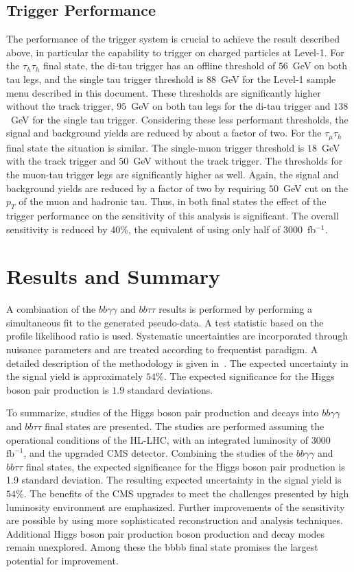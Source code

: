 \subsection{Trigger Performance}
The performance of the trigger system is crucial to achieve the result
described above, in particular the capability to trigger on charged
particles at Level-1. For the $\tau_{h}\tau_{h}$ final state, the
di-tau trigger has an offline threshold of $56$~GeV on both tau legs,
and the single tau trigger threshold is $88$~GeV for the Level-1 sample menu
described in this document. These thresholds are significantly higher
without the track trigger, $95$~GeV on both tau legs for the di-tau
trigger and $138$~GeV for the single tau trigger. Considering these less
performant thresholds, the signal and background yields are reduced by about a factor of
two. For the $\tau_{\mu}\tau_{h}$ final state the situation is similar. The single-muon trigger
threshold is $18$~GeV with the track trigger and $50$~GeV without the track
trigger. The thresholds for the muon-tau trigger legs are significantly
higher as well. Again, the signal and background yields are reduced by a factor of two
by requiring $50$~GeV cut on the $p_T$ of the muon and hadronic tau.
Thus, in both final states the effect of the trigger performance on the sensitivity of this analysis is significant. The overall sensitivity is
reduced by 40\%, the equivalent of  using only half of 3000~fb$^{-1}$.

\section{Results and Summary}
A combination of the  $bb\gamma\gamma$ and $bb\tau\tau$ results is performed by performing a simultaneous fit to the generated pseudo-data. A test statistic based on the profile likelihood ratio is used. Systematic uncertainties are incorporated through nuisance parameters and are treated according to frequentist paradigm. A detailed description of the methodology is given in~\cite{CMS-NOTE-2011-005,Chatrchyan201226}. The expected uncertainty in the signal yield is approximately $54\%$. The expected significance for the Higgs boson pair production is $1.9$ standard deviations.  

To summarize, studies  of the Higgs boson pair production and decays into $bb\gamma\gamma$ and $bb\tau\tau$ final states are presented. The studies are performed assuming the operational conditions of the HL-LHC, with an integrated luminosity of 3000~$\mathrm{fb}^{-1}$, and the upgraded CMS detector. Combining the studies of the  $bb\gamma\gamma$ and $bb\tau\tau$ final states, the expected significance for the Higgs boson pair production is 1.9 standard deviation. The resulting expected uncertainty in the signal yield is $54\%$.  The benefits of the CMS \phasetwo upgrades to meet the challenges presented by high luminosity environment are emphasized. Further improvements of the sensitivity are possible by using more sophisticated reconstruction and analysis techniques. Additional Higgs boson pair production boson production and decay modes remain unexplored. Among these the bbbb final state promises the largest potential for improvement.
